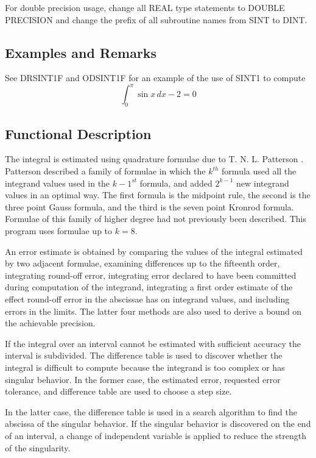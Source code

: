 \documentclass[twoside]{MATH77}
\begin{document}
For double precision usage, change all REAL type statements to DOUBLE
PRECISION and change the prefix of all subroutine names from SINT to
DINT.

\subsection{Examples and Remarks}

See DRSINT1F and ODSINT1F for an example of the use of SINT1 to compute%
\begin{equation*}
\int_0^\pi \sin x\,dx-2=0
\end{equation*}

\subsection{Functional Description}

The integral is estimated using quadrature formulae due to T.  N.  L.
Patterson \cite{Patterson:1968:TOA}.  Patterson described a family of
formulae in which the $ k^{th} $ formula used all the integrand values
used in the $k-1^{st}$ formula, and added $2^{k-1}$ new integrand values
in an optimal way.  The first formula is the midpoint rule, the second is
the three point Gauss formula, and the third is the seven point Kronrod
formula.  Formulae of this family of higher degree had not previously been
described.  This program uses formulae up to $k=8.$

An error estimate is obtained by comparing the values of the integral
estimated by two adjacent formulae, examining differences up to the
fifteenth order, integrating round-off error, integrating error declared to
have been committed during computation of the integrand, integrating a
first order estimate of the effect round-off error in the abscissae has on
integrand values, and including errors in the limits. The latter four
methods are also used to derive a bound on the achievable precision.

If the integral over an interval cannot be estimated with sufficient
accuracy the interval is subdivided. The difference table is used to
discover whether the integral is difficult to compute because the integrand
is too complex or has singular behavior. In the former case, the estimated
error, requested error tolerance, and difference table are used to choose a
step size.

In the latter case, the difference table is used in a search algorithm to
find the abscissa of the singular behavior. If the singular behavior is
discovered on the end of an interval, a change of independent variable is
applied to reduce the strength of the singularity.
\end{document}
